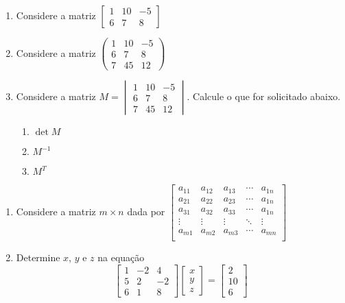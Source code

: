 \documentclass[a4paper, 12pt]{article}
\begin{document}
	\begin{enumerate}
		\item Considere a matriz
		$
			\begin{bmatrix}
				1 & 10 & -5\\
				6 & 7 & 8
			\end{bmatrix}					
		$
		
		\item Considere a matriz
		$
			\begin{pmatrix}
				1 & 10 & -5\\
				6 & 7 & 8\\
				7 & 45 & 12
			\end{pmatrix}					
		$
		
		\item Considere a matriz
		$M = 
			\begin{vmatrix}
				1 & 10 & -5\\
				6 & 7 & 8\\
				7 & 45 & 12
			\end{vmatrix}					
		$. Calcule o que for solicitado abaixo.
		\begin{enumerate}
			\item $\det M$
			\item $M^{-1}$
			\item $M^T$
		\end{enumerate}
	\end{enumerate}
	
	\begin{enumerate}
	\item Considere a matriz $m \times n$ dada por
	$\begin{bmatrix}
	a_{11} & a_{12} & a_{13} & \cdots & a_{1n}\\
	a_{21} & a_{22} & a_{23} & \cdots & a_{1n}\\
	a_{31} & a_{32} & a_{33} & \cdots & a_{1n}\\
	\vdots & \vdots & \vdots & \ddots & \vdots\\ 
	a_{m1} & a_{m2} & a_{m3} & \cdots & a_{mn}\\
	
	\end{bmatrix}
	$
	\item Determine $x$, $y$ e $z$ na equação
	$$\begin{bmatrix}
		1 & -2 & 4 \\
		5 & 2 & -2 \\
		6 & 1 & 8
	\end{bmatrix}
	\begin{bmatrix}
		x \\
		y \\
		z 
	\end{bmatrix}
	=
	\begin{bmatrix}
		2 \\
		10 \\
		6 
	\end{bmatrix}
	$$
	\end{enumerate}
\end{document}
